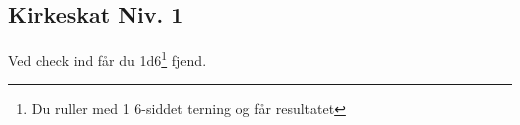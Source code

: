 \subsection*{Kirkeskat Niv. 1}
Ved check ind får du 1d6\footnote{Du ruller med 1 6-siddet terning og får resultatet} fjend.
